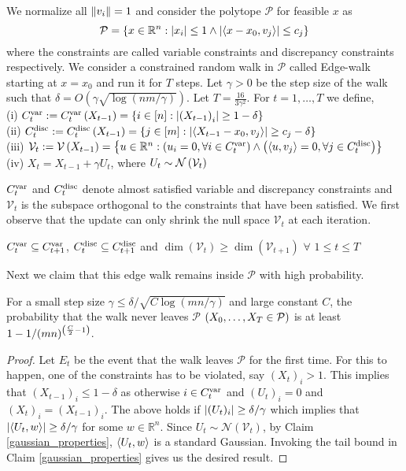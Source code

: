 We normalize all $\left\lVert v_i \right\rVert=1$ and consider the polytope $\mathcal{P}$ for feasible $x$ as
\[ \mathcal{P} = \left\{x\in \mathbb{R}^n : \left\lvert x_i \right\rvert \leq 1 \wedge \left\lvert \left\langle x-x_0,v_j\right\rangle \right\rvert \leq c_j \right\}\]
where the constraints are called variable constraints and discrepancy constraints respectively.
We consider a constrained random walk in $\mathcal{P}$ called Edge-walk starting at $x=x_0$
and run it for $T$ steps. Let $\gamma >0$ be the step size of the walk such that
$\delta = O(\gamma \sqrt{\log(nm/\gamma)})$. Let $T = \frac{16}{3\gamma^2}$.
For $t= 1,\hdots,T$ we define,\\
(i) $C^{\mathrm{var}}_t := C^{\mathrm{var}}_t\left(X_{t-1} \right ) = \left\{ i \in [n] : \left\lvert \left(X_{t-1} \right )_i \right\rvert \geq 1- \delta\right\}$ \\
(ii) $C^{\mathrm{disc}}_t := C^{\mathrm{disc}}_t\left(X_{t-1} \right ) = \left\{j \in [m] : \left\lvert \left\langle X_{t-1}-x_0,v_j\right\rangle \right\rvert \geq c_j - \delta\right\}$ \\
(iii) $\mathcal{V}_t := \mathcal{V}\left(X_{t-1} \right ) = \left\{u \in \mathbb{R}^n : \left(u_i = 0, \forall i \in C^{\mathrm{var}}_t \right ) \wedge \left(\left\langle u,v_j\right\rangle=0, \forall j \in C^{\mathrm{disc}}_t \right ) \right\}$  \\
(iv) $X_t = X_{t-1} + \gamma U_t$, where $U_t \sim \mathcal{N}\left(\mathcal{V}_t \right )$

$C^{\mathrm{var}}_t$ and $C^{\mathrm{disc}}_t$ denote almost satisfied variable and discrepancy constraints and $\mathcal{V}_t$ is the subspace orthogonal to the constraints that have been satisfied.
We first observe that the update can only shrink the null space $\mathcal{V}_t$ at each iteration.
\begin{Claim}
$C^{\mathrm{var}}_t \subseteq C^{\mathrm{var}}_{t+1}$, $C^{\mathrm{disc}}_t \subseteq C^{\mathrm{disc}}_{t+1}$ and $\dim(\mathcal{V}_t) \geq \dim(\mathcal{V}_{t+1})$ $\forall$ $1 \leq t \leq T$
\end{Claim}

Next we claim that this edge walk remains inside $\mathcal{P}$ with high probability.
\begin{Claim}
For a small step size $\gamma \leq \delta/\sqrt{C\log(mn/\gamma)}$ and large constant $C$, the probability that the walk never leaves $\mathcal{P}$ $\left(X_0,\hdots,X_T \in \mathcal{P} \right )$ is at least $1 - 1/(mn)^{\left(\frac{C}{2}-1 \right )}$.
\end{Claim}
\begin{proof}
Let $E_t$ be the event that the walk leaves $\mathcal{P}$ for the first time.
For this to happen, one of the constraints has to be violated, say $(X_t)_i>1$.
This implies that $(X_{t-1})_i \leq 1 - \delta$ as otherwise $i \in C^{\mathrm{var}}_t$ and $(U_t)_i=0$ and $(X_{t})_i=(X_{t-1})_i$.
The above holds if $\left\lvert (U_t)_i \right\rvert \geq \delta/\gamma$ which implies that $\left\lvert \left\langle U_t,w\right\rangle \right\rvert \geq \delta/\gamma$ for some $w \in \mathbb{R}^n$.
Since $U_t \sim \mathcal{N}(\mathcal{V}_t)$, by Claim \ref{gaussian_properties}, $\left\langle U_t,w\right\rangle$ is a standard Gaussian.
Invoking the tail bound in Claim \ref{gaussian_properties} gives us the desired result.
\end{proof}

